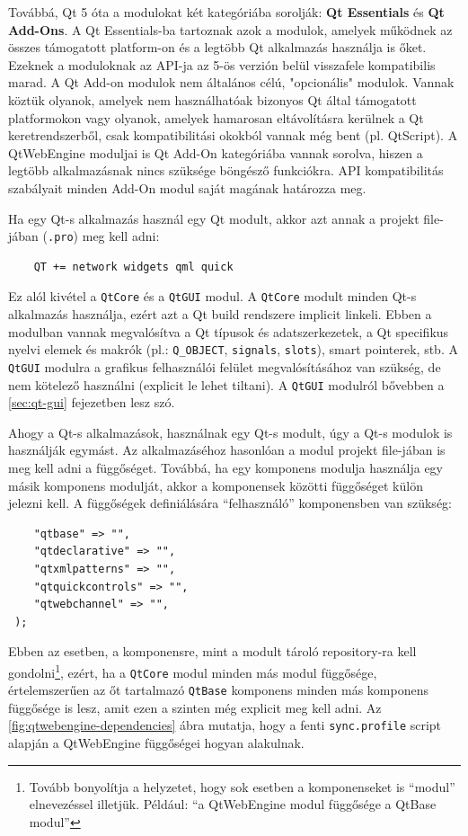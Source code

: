 \documentclass[12pt]{report}
\begin{document}
Továbbá, Qt 5 óta a modulokat két kategóriába sorolják: \textbf{Qt Essentials} és
\textbf{Qt Add-Ons}. A Qt Essentials-ba tartoznak azok a modulok, amelyek működnek az
összes támogatott platform-on és a legtöbb Qt alkalmazás használja is őket. Ezeknek a
moduloknak az API-ja az 5-ös verzión belül visszafele kompatibilis marad.
A Qt Add-on modulok nem általános célú, "opcionális" modulok. Vannak köztük olyanok,
amelyek nem használhatóak bizonyos Qt által támogatott platformokon vagy olyanok, amelyek
hamarosan eltávolításra kerülnek a Qt keretrendszerből, csak kompatibilitási okokból vannak
még bent (pl. QtScript). A QtWebEngine moduljai is Qt Add-On kategóriába vannak sorolva,
hiszen a legtöbb alkalmazásnak nincs szüksége böngésző funkciókra. API kompatibilitás
szabályait minden Add-On modul saját magának határozza meg.
\cite{bib:qt-doc-qtmodules}

Ha egy Qt-s alkalmazás használ egy Qt modult, akkor azt annak a projekt file-jában
(\texttt{.pro}) meg kell adni:
\begin{verbatim}
    QT += network widgets qml quick
\end{verbatim}
Ez alól kivétel a \texttt{QtCore} és a \texttt{QtGUI} modul. A \texttt{QtCore} modult
minden Qt-s alkalmazás használja, ezért azt a Qt build rendszere implicit linkeli.
Ebben a modulban vannak megvalósítva a Qt típusok és adatszerkezetek, a Qt specifikus nyelvi
elemek és makrók (pl.: \texttt{Q\_OBJECT}, \texttt{signals}, \texttt{slots}),
smart pointerek, stb. A \texttt{QtGUI} modulra a grafikus felhasználói felület
megvalósításához van szükség, de nem kötelező használni (explicit le lehet tiltani).
A \texttt{QtGUI} modulról bővebben a \ref{sec:qt-gui} fejezetben lesz szó.

Ahogy a Qt-s alkalmazások, használnak egy Qt-s modult, úgy a Qt-s modulok is használják
egymást. Az alkalmazáséhoz hasonlóan a modul projekt file-jában is meg kell adni a
függőséget. Továbbá, ha egy komponens modulja használja egy másik komponens modulját, akkor
a komponensek közötti függőséget külön jelezni kell. A függőségek definiálására
``felhasználó'' komponensben van szükség:
\begin{lstlisting}[title=sync.profile]
 %dependencies = (
    "qtbase" => "",
    "qtdeclarative" => "",
    "qtxmlpatterns" => "",
    "qtquickcontrols" => "",
    "qtwebchannel" => "",
 );
\end{lstlisting}

\noindent
Ebben az esetben, a komponensre, mint a modult tároló repository-ra kell
gondolni\footnote{Tovább bonyolítja a helyzetet, hogy sok esetben a komponenseket is
``modul'' elnevezéssel illetjük. Például: ``a QtWebEngine modul függősége a QtBase modul''},
ezért, ha a \texttt{QtCore} modul minden más modul függősége, értelemszerűen az őt tartalmazó
\texttt{QtBase} komponens minden más komponens függősége is lesz, amit ezen a szinten
még explicit meg kell adni.
Az \ref{fig:qtwebengine-dependencies} ábra mutatja, hogy a fenti \texttt{sync.profile} script
alapján a QtWebEngine függőségei hogyan alakulnak.
\end{document}
